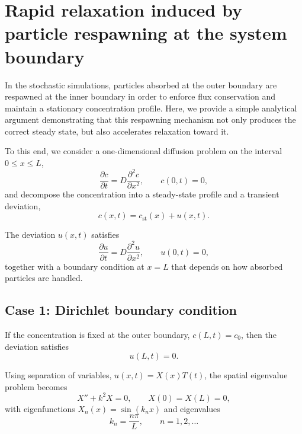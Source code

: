 \section{Rapid relaxation induced by particle respawning at the system boundary}\label{sec:appendix}
In the stochastic simulations, particles absorbed at the outer boundary are respawned at the inner boundary in order to enforce flux conservation and maintain a stationary concentration profile.
Here, we provide a simple analytical argument demonstrating that this respawning mechanism not only produces the correct steady state, but also accelerates relaxation toward it.

To this end, we consider a one-dimensional diffusion problem on the interval $0 \le x \le L$,
\begin{equation}
    \frac{\partial c}{\partial t} = D \frac{\partial^{2} c}{\partial x^{2}}, \qquad c(0,t) = 0,
    \label{eq:1D_diff}
\end{equation}
and decompose the concentration into a steady-state profile and a transient deviation,
\begin{equation}
    c(x,t) = c_{\mathrm{st}}(x) + u(x,t).
    \label{eq:decomposition}
\end{equation}

The deviation $u(x,t)$ satisfies
\begin{equation}
    \frac{\partial u}{\partial t} = D \frac{\partial^{2} u}{\partial x^{2}}, \qquad u(0,t) = 0,
    \label{eq:u_eq}
\end{equation}
together with a boundary condition at $x = L$ that depends on how absorbed particles are handled.

\subsection{Case 1: Dirichlet boundary condition}\label{sec:case1}
If the concentration is fixed at the outer boundary, $c(L,t) = c_{0}$, then the deviation satisfies
\begin{equation}
    u(L,t) = 0.
    \label{eq:bc_dirichlet}
\end{equation}

Using separation of variables, $u(x,t) = X(x) T(t)$, the spatial eigenvalue problem becomes
\begin{equation}
    X'' + k^{2} X = 0, \qquad X(0) = X(L) = 0,
    \label{eq:eigen_dirichlet}
\end{equation}
with eigenfunctions $X_{n}(x) = \sin(k_{n} x)$ and eigenvalues
\begin{equation}
    k_{n} = \frac{n\pi}{L}, \qquad n = 1, 2, \ldots
    \label{eq:kn_dirichlet}
\end{equation}

